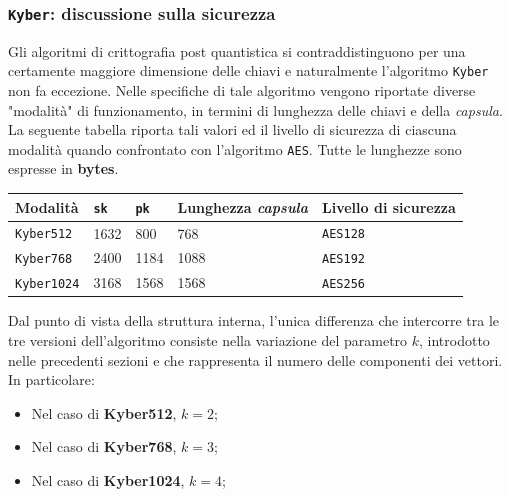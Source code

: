 \documentclass[a4paper, 12pt, oneside]{article}
\theoremstyle{definition}
\begin{document}
\newpage
\subsubsection{\texttt{Kyber}: discussione sulla sicurezza}
Gli algoritmi di crittografia post quantistica si contraddistinguono per una certamente maggiore dimensione delle chiavi e naturalmente l'algoritmo \texttt{Kyber} non fa eccezione. Nelle specifiche di tale algoritmo vengono riportate diverse "modalità" di funzionamento, in termini di lunghezza delle chiavi e della \textit{capsula}. La seguente tabella riporta tali valori ed il livello di sicurezza di ciascuna modalità quando confrontato con l'algoritmo \texttt{AES}. Tutte le lunghezze sono espresse in \textbf{bytes}.

\begin{table}[H]
    \centering
    \begin{tabular}{|l|l|l|l|l|}
    \hline
    Modalità  & \texttt{sk} \footnotemark[5] & \texttt{pk} \footnotemark[6] & Lunghezza \textit{capsula} & Livello di sicurezza \\ \hline
    \texttt{Kyber512}  & 1632                     & 800                       & 768                        & \texttt{AES128}              \\ \hline
    \texttt{Kyber768}  & 2400                     & 1184                      & 1088                       & \texttt{AES192}              \\ \hline
    \texttt{Kyber1024} & 3168                     & 1568                      & 1568                       & \texttt{AES256}              \\ \hline
    \end{tabular}
\end{table}


Dal punto di vista della struttura interna, l'unica differenza che intercorre tra le tre versioni dell'algoritmo consiste nella variazione del parametro $k$, introdotto nelle precedenti sezioni e che rappresenta il numero delle componenti dei vettori. In particolare:

\begin{itemize}
    \item Nel caso di \textbf{Kyber512}, $k = 2$;
    \item Nel caso di \textbf{Kyber768}, $k = 3$;
    \item Nel caso di \textbf{Kyber1024}, $k = 4$;
\end{itemize}
\end{document}
